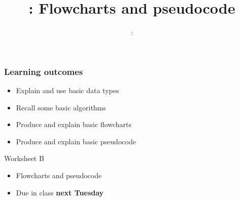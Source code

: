 \usepackage{../../beamerthemeFalmouthGamesAcademy}
\usepackage[utf8]{inputenc}
\usepackage{multimedia}
\graphicspath{ {../../} }

\lstset{language=Python
}

\usepackage[normalem]{ulem}
\usepackage{wasysym}

\usepackage{algpseudocode}

\usepackage{pdfpages}

\usetikzlibrary{arrows,automata}




\title{\sessionnumber: Flowcharts and pseudocode}
\subtitle{\modulecode: \moduletitle}

\frame{\titlepage} 

\begin{frame}
	\frametitle{Learning outcomes}
	\begin{itemize}
		\item Explain and use basic data types
		\item Recall some basic algorithms
		\item Produce and explain basic flowcharts
		\item Produce and explain basic pseudocode
	\end{itemize}
\end{frame}






\begin{frame}{Worksheet B}
	\begin{itemize}
		\item Flowcharts and pseudocode
		\item Due in class \textbf{next Tuesday}
	\end{itemize}
\end{frame}


